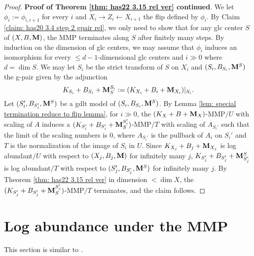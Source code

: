 \documentclass[11pt]{amsart}
\numberwithin{equation}{section}
\newcommand{\Mm}{{\bf{M}}}
\theoremstyle{definition}
\theoremstyle{definition}
\theoremstyle{definition}
\begin{document}
\begin{proof}
\noindent\textbf{Proof of Theorem \ref{thm: has22 3.15 rel ver} continued}. We let $\phi_i:=\phi_{i,i+1}$ for every $i$ and $X_i\rightarrow Z_i\leftarrow X_{i+1}$ the flip defined by $\phi_i$. By Claim \ref{claim: has20 3.4 step 2 gpair rel}, we only need to show that for any glc center $S$ of $(X,B,\Mm)$, the MMP terminates along $S$ after finitely many steps. By induction on the dimension of glc centers, we may assume that $\phi_i$ induces an isomorphism for every $\leq d-1$-dimensional glc centers and $i\gg 0$ where $d=\dim S$. We may let $S_i$ be the strict transform of $S$ on $X_i$ and $(S_i,B_{S_i},\Mm^{S})$ the g-pair given by the adjunction
$$K_{S_i}+B_{S_i}+\Mm_{S}^{S_i}:=(K_{X_i}+B_i+\Mm_{X_i})|_{S_i}.$$
Let $(S_i',B_{S_i'},\Mm^S)$ be a gdlt model of $(S_i,B_{S_i},\Mm^{S})$. By Lemma \ref{lem: special termination reduce to flip lemma}, for $i\gg0$, the $(K_X+B+\Mm_X)$-MMP$/U$ with scaling of $A$ induces a $(K_{S'_i}+B_{S'_i}+\Mm_{S}^{S'_i})$-MMP$/T$ with scaling of $A_{S_i'}$ such that the limit of the scaling numbers is $0$, where $A_{S_i'}$ is the pullback of $A_i$ on $S_i'$ and $T$ is the normalization of the image of $S_i$ in $U$. Since $K_{X_j}+B_j+\Mm_{X_j}$ is log abundant$/U$ with respect to $(X_j,B_j,\Mm)$ for infinitely many $j$, $K_{S_j'}+B_{S_j'}+\Mm^S_{S'_j}$ is log abundant$/T$ with respect to $(S_j',B_{S_j'},\Mm^S)$ for infinitely many $j$. By Theorem \ref{thm: has22 3.15 rel ver} in dimension $<\dim X$, the $(K_{S'_j}+B_{S'_j}+\Mm_{S}^{S'_j})$-MMP$/T$ terminates, and the claim follows.
\end{proof}

\section{Log abundance under the MMP}

This section is similar to \cite[Section 3 and Theorem 4.1]{Has20b}.
\end{document}
